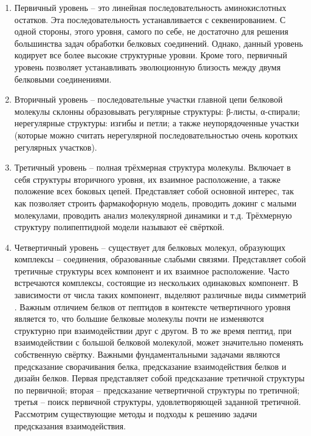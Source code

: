 \begin{enumerate}
\item Первичный уровень – это линейная последовательность аминокислотных остатков. Эта последовательность устанавливается с секвенированием. С одной стороны, этого уровня, самого по себе, не достаточно для решения большинства задач обработки белковых соединений. Однако, данный уровень кодирует все более высокие структурные уровни. Кроме того, первичный уровень позволяет устанавливать эволюционную близость между двумя белковыми соединениями.
\item Вторичный уровень – последовательные участки главной цепи белковой молекулы склонны образовывать регулярные структуры: β-листы, α-спирали; нерегулярные структуры: изгибы и петли; а также неупорядоченные участки (которые можно считать нерегулярной последовательностью очень коротких регулярных участков).
\item Третичный уровень – полная трёхмерная структура молекулы. Включает в себя структуры вторичного уровня, их взаимное расположение, а также положение всех боковых цепей. Представляет собой основной интерес, так как позволяет строить фармакофорную модель, проводить докинг с малыми молекулами, проводить анализ молекулярной динамики и т.д. Трёхмерную структуру полипептидной модели называют её свёрткой. 
\item Четвертичный уровень – существует для белковых молекул, образующих комплексы – соединения, образованные слабыми связями. Представляет собой третичные структуры всех компонент и их взаимное расположение. Часто встречаются комплексы, состоящие из нескольких одинаковых компонент. В зависимости от числа таких компонент, выделяют различные виды симметрий \cite{symmetry}. Важным отличием белков от пептидов в контексте четвертичного уровня является то, что большие белковые молекулы почти не изменяются структурно при взаимодействии друг с другом. В то же время пептид, при взаимодействии с большой белковой молекулой, может значительно поменять собственную свёртку.
Важными фундаментальными задачами являются предсказание сворачивания белка, предсказание взаимодействия белков и дизайн белков. Первая представляет собой предсказание третичной структуры по первичной; вторая – предсказание четвертичной структуры по третичной; третья – поиск первичной структуры, удовлетворяющей заданной третичной. Рассмотрим существующие методы и подходы к решению задачи предсказания взаимодействия.
\end{enumerate}
